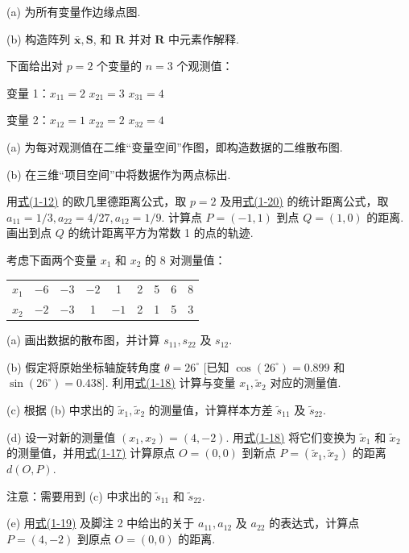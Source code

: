 
(a) 为所有变量作边缘点图.

(b) 构造阵列 $\bar{\bm{x}}, \bm{S}$, 和 $\bm{R}$ 并对 $\bm{R}$ 中元素作解释.

 下面给出对 $p = 2$ 个变量的 $n = 3$ 个观测值：

变量 1：\quad $x_{11} = 2$ \quad $x_{21} = 3$ \quad $x_{31} = 4$

变量 2：\quad $x_{12} = 1$ \quad $x_{22} = 2$ \quad $x_{32} = 4$

(a) 为每对观测值在二维“变量空间”作图，即构造数据的二维散布图.

(b) 在三维“项目空间”中将数据作为两点标出.

 用\hyperref[eq:1-12]{式(1-12)} 的欧几里德距离公式，取 $p = 2$ 及用\hyperref[eq:1-20]{式(1-20)} 的统计距离公式，取 $a_{11} = 1/3, a_{22} = 4/27, a_{12} = 1/9$. 计算点 $P = (-1, 1)$ 到点 $Q = (1, 0)$ 的距离. 画出到点 $Q$ 的统计距离平方为常数 1 的点的轨迹.

 考虑下面两个变量 $x_1$ 和 $x_2$ 的 8 对测量值：

\begin{mvtable}
\begin{tabular}{lcccccccc}
\toprule
$x_1$ & $-6$ & $-3$ & $-2$ & 1 & 2 & 5 & 6 & 8 \\
$x_2$ & $-2$ & $-3$ & 1 & $-1$ & 2 & 1 & 5 & 3 \\
\bottomrule
\end{tabular}
\end{mvtable}

(a) 画出数据的散布图，并计算 $s_{11}, s_{22}$ 及 $s_{12}$.

(b) 假定将原始坐标轴旋转角度 $\theta = 26^\circ$ [已知 $\cos(26^\circ) = 0.899$ 和 $\sin(26^\circ) = 0.438$]. 利用\hyperref[eq:1-18]{式(1-18)} 计算与变量 $x_1, \tilde{x}_2$ 对应的测量值.

(c) 根据 (b) 中求出的 $\tilde{x}_1, \tilde{x}_2$ 的测量值，计算样本方差 $\tilde{s}_{11}$ 及 $\tilde{s}_{22}$.

(d) 设一对新的测量值 $(x_1, x_2) = (4, -2)$. 用\hyperref[eq:1-18]{式(1-18)} 将它们变换为 $\tilde{x}_1$ 和 $\tilde{x}_2$ 的测量值，并用\hyperref[eq:1-17]{式(1-17)} 计算原点 $O = (0, 0)$ 到新点 $P = (\tilde{x}_1, \tilde{x}_2)$ 的距离 $d(O, P)$.

注意：需要用到 (c) 中求出的 $\tilde{s}_{11}$ 和 $\tilde{s}_{22}$.

(e) 用\hyperref[eq:1-19]{式(1-19)} 及脚注 2 中给出的关于 $a_{11}, a_{12}$ 及 $a_{22}$ 的表达式，计算点 $P = (4, -2)$ 到原点 $O = (0, 0)$ 的距离.

